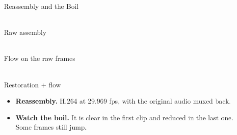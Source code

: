 \begin{frame}{Reassembly and the Boil}
    \vspace*{-0.1cm}
    \begin{center}
        \begin{minipage}[b]{4.2cm}
            \centering
            \\[0.08cm]
            {\scriptsize Raw assembly}
        \end{minipage}\hfill
        \begin{minipage}[b]{4.2cm}
            \centering
            \\[0.08cm]
            {\scriptsize Flow on the raw frames}
        \end{minipage}\hfill
        \begin{minipage}[b]{4.2cm}
            \centering
            \\[0.08cm]
            {\scriptsize Restoration + flow}
        \end{minipage}
    \end{center}

    \vspace{0.1cm}
    \small
    \begin{itemize}
        \item \textbf{Reassembly.} H.264 at 29.969 fps, with the original audio muxed back.
        \item \textbf{Watch the boil.} It is clear in the first clip and reduced in the last one. Some frames still jump.
    \end{itemize}

\end{frame}

